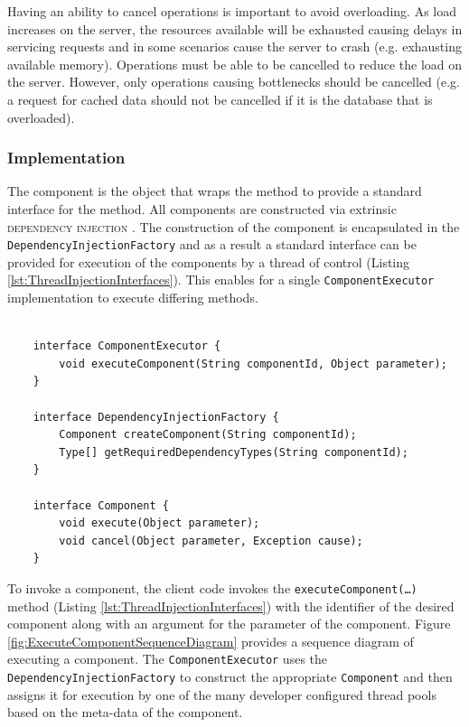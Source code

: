 \documentclass[prodmode]{style/acmlarge}
\begin{document}
Having an ability to cancel operations is important to avoid overloading.  As
load increases on the server, the resources available will be exhausted causing
delays in servicing requests and in some scenarios cause the server to crash
(e.g. exhausting available memory).  Operations must be able to be cancelled to
reduce the load on the server.  However, only operations causing bottlenecks
should be cancelled (e.g. a request for cached data should not be cancelled if
it is the database that is overloaded).

\subsubsection*{Implementation}

The component is the object that wraps the method to provide a
standard interface for the method.  All components are constructed via extrinsic
\textsc{dependency injection} \cite{ioc}.  The construction of the component is
encapsulated in the \texttt{DependencyInjectionFactory} and as a result a
standard interface can be provided for execution of the components by a thread
of control (Listing \ref{lst:ThreadInjectionInterfaces}).  This enables for a
single \texttt{ComponentExecutor} implementation to execute differing methods.

\begin{lstlisting}[float,label=lst:ThreadInjectionInterfaces]

    interface ComponentExecutor {
        void executeComponent(String componentId, Object parameter);
    }

    interface DependencyInjectionFactory {
        Component createComponent(String componentId);
        Type[] getRequiredDependencyTypes(String componentId);
    }

    interface Component {
        void execute(Object parameter); 
        void cancel(Object parameter, Exception cause);
    }
\end{lstlisting}

To invoke a component, the client code invokes the
\texttt{executeComponent(\ldots)} method (Listing
\ref{lst:ThreadInjectionInterfaces}) with the identifier of the desired
component along with an argument for the parameter of the component.
Figure \ref{fig:ExecuteComponentSequenceDiagram} provides a sequence diagram of
executing a component.  The \texttt{ComponentExecutor} uses the
\texttt{DependencyInjectionFactory} to construct the appropriate
\texttt{Component} and then assigns it for execution by one of the many
developer configured thread pools based on the meta-data of the component.
\end{document}
